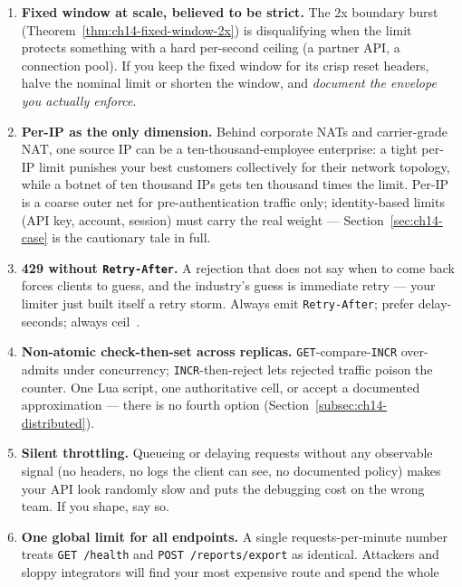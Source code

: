 \begin{enumerate}
  \item \textbf{Fixed window at scale, believed to be strict.} The 2x
        boundary burst (Theorem~\ref{thm:ch14-fixed-window-2x}) is
        disqualifying when the limit protects something with a hard
        per-second ceiling (a partner API, a connection pool). If you keep
        the fixed window for its crisp reset headers, halve the nominal
        limit or shorten the window, and \emph{document the envelope you
        actually enforce}.
  \item \textbf{Per-IP as the only dimension.} Behind corporate NATs and
        carrier-grade NAT, one source IP can be a ten-thousand-employee
        enterprise: a tight per-IP limit punishes your best customers
        collectively for their network topology, while a botnet of ten
        thousand IPs gets ten thousand times the limit. Per-IP is a coarse
        outer net for pre-authentication traffic only; identity-based
        limits (API key, account, session) must carry the real weight ---
        Section~\ref{sec:ch14-case} is the cautionary tale in full.
  \item \textbf{429 without \texttt{Retry-After}.} A rejection that does not
        say when to come back forces clients to guess, and the industry's
        guess is immediate retry --- your limiter just built itself a retry
        storm. Always emit \texttt{Retry-After}; prefer delay-seconds;
        always ceil~\cite{rfc9110}.
  \item \textbf{Non-atomic check-then-set across replicas.}
        \texttt{GET}-compare-\texttt{INCR} over-admits under concurrency;
        \texttt{INCR}-then-reject lets rejected traffic poison the counter.
        One Lua script, one authoritative cell, or accept a documented
        approximation --- there is no fourth option
        (Section~\ref{subsec:ch14-distributed}).
  \item \textbf{Silent throttling.} Queueing or delaying requests without
        any observable signal (no headers, no logs the client can see, no
        documented policy) makes your API look randomly slow and puts the
        debugging cost on the wrong team. If you shape, say so.
  \item \textbf{One global limit for all endpoints.} A single
        requests-per-minute number treats \texttt{GET /health} and
        \texttt{POST /reports/export} as identical. Attackers and sloppy
        integrators will find your most expensive route and spend the whole

\end{enumerate}

